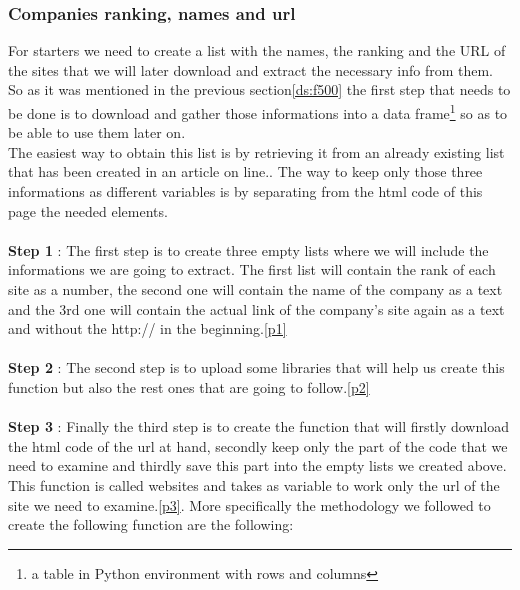 \documentclass{article}
\begin{document}
\subsubsection{Companies ranking, names and url}
For starters we need to create a list with the names, the ranking and the URL of the sites that we will later download and extract the necessary info from them. So as it was mentioned in the previous section\ref{ds:f500} the first step that needs to be done is to download and gather those informations into a data frame\footnote{a table in Python environment with rows and columns} so as to be able to use them later on.\\
The easiest way to obtain this list is by retrieving it from an already existing list that has been created in an article on line.\cite{key33}. The way to keep only those three informations as different variables is by separating from the html code of this page the needed elements.\\\\
\textbf{Step 1} : The first step is to create three empty lists where we will include the informations we are going to extract. The first list will contain the rank of each site as a number, the second one will contain the name of the company as a text and the 3rd one will contain the actual link of the company's site again as a text and without the http:// in the beginning.\ref{p1}\\\\
\textbf{Step 2} : The second step is to upload some libraries that will help us create this function but also the rest ones that are going to follow.\ref{p2}\\\\
\textbf{Step 3} : Finally the third step is to create the function that will firstly download the html code of the url at hand, secondly keep only the part of the code that we need to examine and thirdly save this part into the empty lists we created above. This function is called websites and takes as variable to work only the url of the site we need to examine.\ref{p3}. More specifically the methodology we followed to create the following function are the following:
\end{document}
